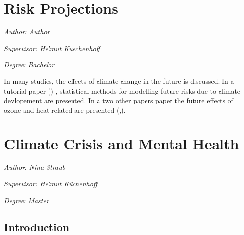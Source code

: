 \documentclass[
]{krantz}
\begin{document}
\chapter{Risk Projections}\label{he4}

\emph{Author: Author}

\emph{Supervisor: Helmut Kuechenhoff}

\emph{Degree: Bachelor}

In many studies, the effects of climate change in the future is discussed.
In a tutorial paper (\citet{vicedo}) , statistical methods for modelling future risks due to climate devlopement are presented. In a two other papers paper the future effects of ozone and heat related are presented (\citet{domingo},\citet{chen}).

\chapter{Climate Crisis and Mental Health}\label{menh3}

\emph{Author: Nina Straub}

\emph{Supervisor: Helmut Küchenhoff}

\emph{Degree: Master}

\section{Introduction}\label{introduction-8}
\end{document}

